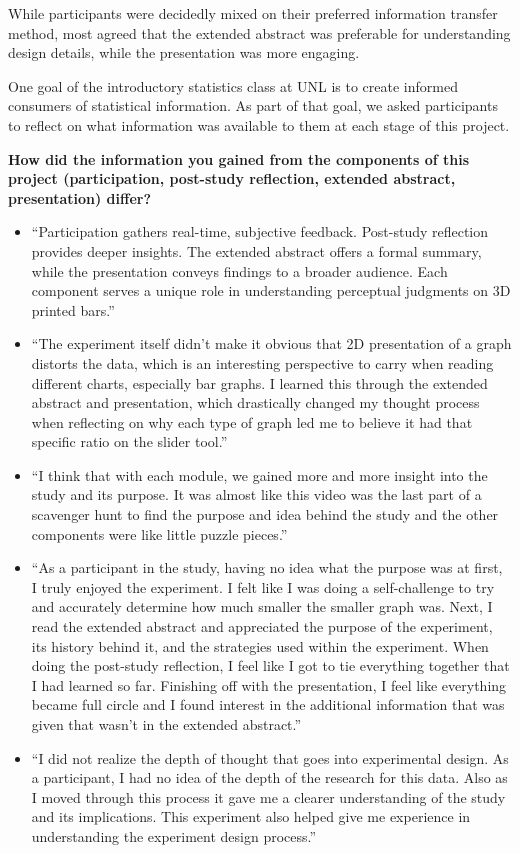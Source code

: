 \documentclass[runningheads
]{llncs}
\providecommand{\tightlist}{%
  \setlength{\itemsep}{0pt}\setlength{\parskip}{0pt}}\usepackage{longtable,booktabs,array}
\begin{document}
While participants were decidedly mixed on their preferred information
transfer method, most agreed that the extended abstract was preferable
for understanding design details, while the presentation was more
engaging.

One goal of the introductory statistics class at UNL is to create
informed consumers of statistical information. As part of that goal, we
asked participants to reflect on what information was available to them
at each stage of this project.

\textbf{How did the information you gained from the components of this
project (participation, post-study reflection, extended abstract,
presentation) differ?}

\begin{itemize}
\tightlist
\item
  ``Participation gathers real-time, subjective feedback. Post-study
  reflection provides deeper insights. The extended abstract offers a
  formal summary, while the presentation conveys findings to a broader
  audience. Each component serves a unique role in understanding
  perceptual judgments on 3D printed bars.''
\item
  ``The experiment itself didn't make it obvious that 2D presentation of
  a graph distorts the data, which is an interesting perspective to
  carry when reading different charts, especially bar graphs. I learned
  this through the extended abstract and presentation, which drastically
  changed my thought process when reflecting on why each type of graph
  led me to believe it had that specific ratio on the slider tool.''
\item
  ``I think that with each module, we gained more and more insight into
  the study and its purpose. It was almost like this video was the last
  part of a scavenger hunt to find the purpose and idea behind the study
  and the other components were like little puzzle pieces.''
\item
  ``As a participant in the study, having no idea what the purpose was
  at first, I truly enjoyed the experiment. I felt like I was doing a
  self-challenge to try and accurately determine how much smaller the
  smaller graph was. Next, I read the extended abstract and appreciated
  the purpose of the experiment, its history behind it, and the
  strategies used within the experiment. When doing the post-study
  reflection, I feel like I got to tie everything together that I had
  learned so far. Finishing off with the presentation, I feel like
  everything became full circle and I found interest in the additional
  information that was given that wasn't in the extended abstract.''
\item
  ``I did not realize the depth of thought that goes into experimental
  design. As a participant, I had no idea of the depth of the research
  for this data. Also as I moved through this process it gave me a
  clearer understanding of the study and its implications. This
  experiment also helped give me experience in understanding the
  experiment design process.''
\end{itemize}
\end{document}
